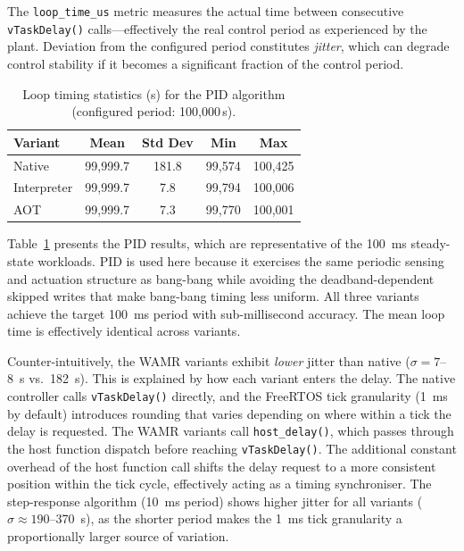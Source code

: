\documentclass[12pt, a4paper]{report}
\begin{document}
The \texttt{loop\_time\_us} metric measures the actual time between consecutive \texttt{vTaskDelay()} calls---effectively the real control period as experienced by the plant. Deviation from the configured period constitutes \textit{jitter}, which can degrade control stability if it becomes a significant fraction of the control period.

\begin{table}[htbp]
\centering
\caption{Loop timing statistics (\textmu{}s) for the PID algorithm (configured period: 100,000\,\textmu{}s).}
\label{tab:loop-timing}
\small
\begin{tabular}{@{}lcccc@{}}
\toprule
\textbf{Variant} & \textbf{Mean} & \textbf{Std Dev} & \textbf{Min} & \textbf{Max} \\
\midrule
Native       & 99,999.7 & 181.8 & 99,574 & 100,425 \\
Interpreter  & 99,999.7 & 7.8   & 99,794 & 100,006 \\
AOT          & 99,999.7 & 7.3   & 99,770 & 100,001 \\
\bottomrule
\end{tabular}
\end{table}

Table~\ref{tab:loop-timing} presents the PID results, which are representative of the 100~ms steady-state workloads. PID is used here because it exercises the same periodic sensing and actuation structure as bang-bang while avoiding the deadband-dependent skipped writes that make bang-bang timing less uniform. All three variants achieve the target 100~ms period with sub-millisecond accuracy. The mean loop time is effectively identical across variants.

Counter-intuitively, the WAMR variants exhibit \textit{lower} jitter than native ($\sigma = 7$--8~\textmu{}s vs.\ 182~\textmu{}s). This is explained by how each variant enters the delay. The native controller calls \texttt{vTaskDelay()} directly, and the FreeRTOS tick granularity (1~ms by default) introduces rounding that varies depending on where within a tick the delay is requested. The WAMR variants call \texttt{host\_delay()}, which passes through the host function dispatch before reaching \texttt{vTaskDelay()}. The additional constant overhead of the host function call shifts the delay request to a more consistent position within the tick cycle, effectively acting as a timing synchroniser. The step-response algorithm (10~ms period) shows higher jitter for all variants ($\sigma \approx 190$--370~\textmu{}s), as the shorter period makes the 1~ms tick granularity a proportionally larger source of variation.
\end{document}
